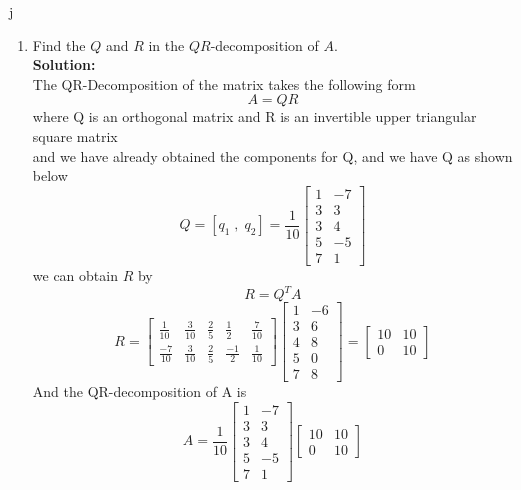 j\documentclass[12pt]{article}
\begin{document}
\begin{enumerate}
\begin{enumerate}
  
		\item Find the $Q$ and $R$ in the $QR$-decomposition of $A$.\\
        \textbf{Solution:}\\
        The QR-Decomposition of the matrix takes the following form
        \[
        A=QR
        \]
        where Q is an orthogonal matrix and R is an invertible upper triangular square matrix
        \\
        and we have already obtained the components for Q, and we have Q as shown below
        \[
        Q = [q_1 \;,\;q_2] = 
        \frac{1}{10}
        \begin{bmatrix}
            1&-7\\
            3&3\\
            3&4\\
            5&-5\\
            7&1
        \end{bmatrix}
        \]
        we can obtain $R$ by
        \[
        R=Q^TA
        \]
        \[
        R=
        \begin{bmatrix}
        \frac{1}{10} & \frac{3}{10} & \frac{2}{5} & \frac{1}{2} & \frac{7}{10} \\
        \frac{-7}{10} & \frac{3}{10} & \frac{2}{5} & \frac{-1}{2} & \frac{1}{10}
        \end{bmatrix}
        \begin{bmatrix}
        1 & -6 \\
        3 & 6 \\
        4 & 8 \\
        5 & 0 \\
        7 & 8
        \end{bmatrix}
        =
        \begin{bmatrix}
            10&10\\
            0&10
        \end{bmatrix}
        \]
        And the QR-decomposition of A is
        \[
        A = 
        \frac{1}{10}
        \begin{bmatrix}
            1&-7\\
            3&3\\
            3&4\\
            5&-5\\
            7&1
        \end{bmatrix}
        \begin{bmatrix}
            10&10\\
            0&10
        \end{bmatrix}
        \]



\end{enumerate}
\end{enumerate}
\end{document}
